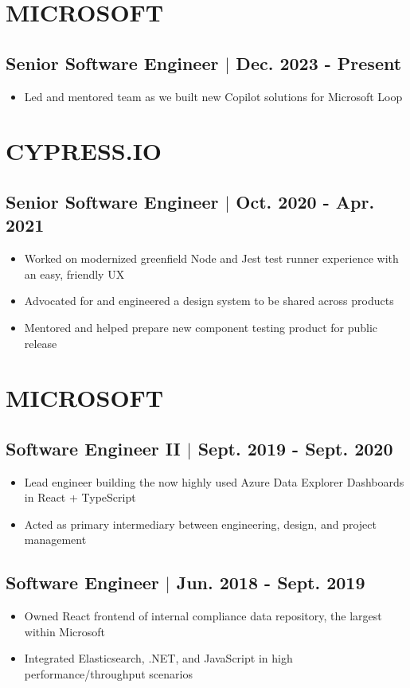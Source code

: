 \documentclass[10pt]{article}
\begin{document}
\section{MICROSOFT}
\subsection{Senior Software Engineer $\vert$ Dec. 2023 - Present}
\begin{itemize}
    \item Led and mentored team as we built new Copilot solutions for Microsoft Loop
\end{itemize}

\section{CYPRESS.IO}
\subsection{Senior Software Engineer $\vert$ Oct. 2020 - Apr. 2021}
\begin{itemize}
    \item Worked on modernized greenfield Node and Jest test runner experience with an easy, friendly UX
    \item Advocated for and engineered a design system to be shared across products
    \item Mentored and helped prepare new component testing product for public release
\end{itemize}
 
\section{MICROSOFT}
\subsection{Software Engineer II $\vert$ Sept. 2019 - Sept. 2020}
\begin{itemize}
    \item Lead engineer building the now highly used Azure Data Explorer Dashboards in React + TypeScript
    \item Acted as primary intermediary between engineering, design, and project management
\end{itemize}

\subsection{Software Engineer $\vert$ Jun. 2018 - Sept. 2019}
\begin{itemize}
    \item Owned React frontend of internal compliance data repository, the largest within Microsoft
    \item Integrated Elasticsearch, .NET, and JavaScript in high performance/throughput scenarios
\end{itemize}
\end{document}
